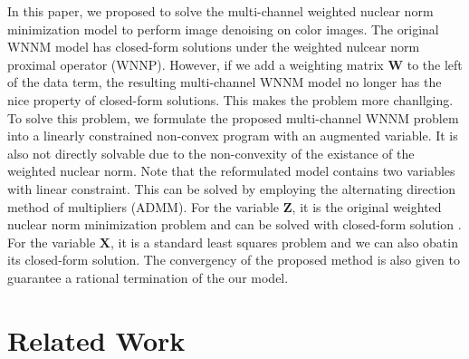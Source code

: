 \documentclass[10pt,twocolumn,letterpaper]{article}
\begin{document}
In this paper, we proposed to solve the multi-channel weighted nuclear norm minimization model to perform image denoising on color images. The original WNNM model has closed-form solutions under the weighted nulcear norm proximal operator (WNNP). However, if we add a weighting matrix $\mathbf{W}$ to the left of the data term, the resulting multi-channel WNNM model no longer has the nice property of closed-form solutions. This makes the problem more chanllging. To solve this problem, we formulate the proposed multi-channel WNNM problem into a linearly constrained non-convex program with an augmented variable. It is also not directly solvable due to the non-convexity of the existance of the weighted nuclear norm. Note that the reformulated model contains two variables with linear constraint. This can be solved by employing the alternating direction method of multipliers (ADMM). For the variable $\mathbf{Z}$, it is the original weighted nuclear norm minimization problem and can be solved with closed-form solution \cite{wnnm,lugsvt}. For the variable $\mathbf{X}$, it is a standard least squares problem and we can also obatin its closed-form solution. The convergency of the proposed method is also given to guarantee a rational termination of the our model. 



\section{Related Work}
\end{document}

